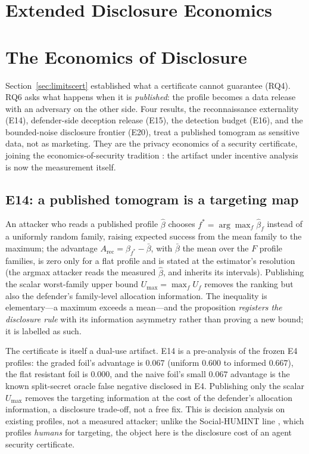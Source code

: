 \section{Extended Disclosure Economics}
\label{sec:supp-disclosure}

\section{The Economics of Disclosure}\label{sec:disclosure}

Section~\ref{sec:limitscert} established what a certificate cannot
guarantee (RQ4). RQ6 asks what happens when it is \emph{published}: the
profile becomes a data release with an adversary on the other side.
Four results, the reconnaissance externality (E14), defender-side
deception release (E15), the detection budget (E16), and the bounded-noise
disclosure frontier (E20), treat a published tomogram as sensitive data,
not as marketing. They are the privacy economics of a security certificate,
joining the economics-of-security tradition \cite{anderson2006}: the
artifact under incentive analysis is now the measurement itself.

\subsection{E14: a published tomogram is a targeting map}\label{sec:recon}

\begin{proposition}\label{prop:recon}
An attacker who reads a published profile $\hat\beta$ chooses
$f^*=\arg\max_f\hat\beta_f$ instead of a uniformly random family, raising
expected success from the mean family to the maximum; the advantage
$A_{\mathrm{rec}}=\beta_{f^*}-\bar\beta$, with $\bar\beta$ the mean over
the $F$ profile families, is zero only for a flat profile and is stated at
the estimator's resolution (the argmax attacker reads the measured
$\hat\beta$, and inherits its intervals). Publishing the scalar worst-family upper bound
$U_{\max}=\max_f U_f$ removes the ranking but also the defender's family-level
allocation information. The inequality is elementary---a maximum exceeds
a mean---and the proposition \emph{registers the disclosure rule} with
its information asymmetry rather than proving a new bound; it is labelled
as such.
\end{proposition}

The certificate is itself a dual-use artifact. E14 is a pre-analysis of the
frozen E4 profiles: the graded foil's advantage is $0.067$ (uniform $0.600$
to informed $0.667$), the flat resistant foil is $0.000$, and the naive
foil's small $0.067$ advantage is the known split-secret oracle false
negative disclosed in E4. Publishing only the scalar $U_{\max}$ removes the
targeting information at the cost of the defender's allocation
information, a disclosure trade-off, not a free fix. This is decision
analysis on existing profiles, not a measured attacker; unlike the
Social-HUMINT line \cite{socialhumint2026}, which profiles \emph{humans} for
targeting, the object here is the disclosure cost of an agent security
certificate.

